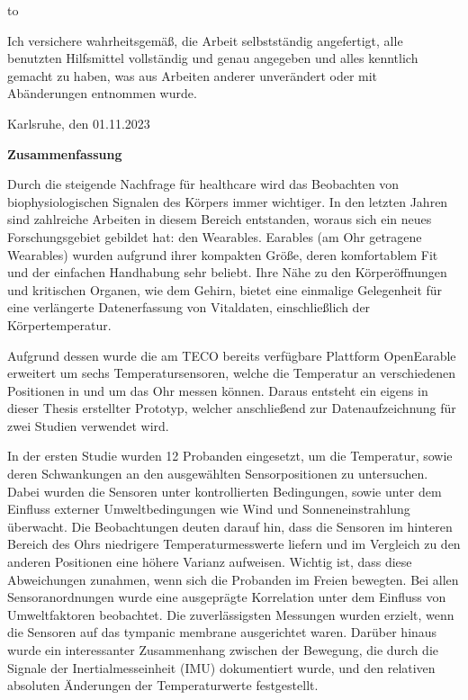 \thispagestyle{empty}
\vspace*{42\baselineskip}
\hbox to \textwidth{\hrulefill}
\par
Ich versichere wahrheitsgemäß, die Arbeit selbstständig angefertigt, alle benutzten Hilfsmittel vollständig und genau angegeben und alles kenntlich gemacht zu haben, was aus Arbeiten anderer unverändert oder mit Abänderungen entnommen wurde.

Karlsruhe, den 01.11.2023

\cleardoublepage

\vspace*{1em}
\begin{center}
	\textbf{Zusammenfassung}
\end{center}
\par

Durch die steigende Nachfrage für healthcare wird das Beobachten von biophysiologischen Signalen des Körpers immer wichtiger.
In den letzten Jahren sind zahlreiche Arbeiten in diesem Bereich entstanden, woraus sich ein neues Forschungsgebiet gebildet hat: den Wearables.
Earables (am Ohr getragene Wearables) wurden aufgrund ihrer kompakten Größe, deren komfortablem Fit und der einfachen Handhabung sehr beliebt. Ihre Nähe zu den Körperöffnungen und kritischen Organen, wie dem Gehirn, bietet eine einmalige Gelegenheit für eine verlängerte Datenerfassung von Vitaldaten, einschließlich der Körpertemperatur.

Aufgrund dessen wurde die am TECO bereits verfügbare Plattform OpenEarable erweitert um sechs Temperatursensoren, welche die Temperatur an verschiedenen Positionen in und um das Ohr messen können. 
Daraus entsteht ein eigens in dieser Thesis erstellter Prototyp, welcher anschließend zur Datenaufzeichnung für zwei Studien verwendet wird.

In der ersten Studie wurden 12 Probanden eingesetzt, um die Temperatur, sowie deren Schwankungen an den ausgewählten Sensorpositionen zu untersuchen. 
Dabei wurden die Sensoren unter kontrollierten Bedingungen, sowie unter dem Einfluss externer Umweltbedingungen wie Wind und Sonneneinstrahlung überwacht. 
Die Beobachtungen deuten darauf hin, dass die Sensoren im hinteren Bereich des Ohrs niedrigere Temperaturmesswerte liefern und im Vergleich zu den anderen Positionen eine höhere Varianz aufweisen. 
Wichtig ist, dass diese Abweichungen zunahmen, wenn sich die Probanden im Freien bewegten. 
Bei allen Sensoranordnungen wurde eine ausgeprägte Korrelation unter dem Einfluss von Umweltfaktoren beobachtet. 
Die zuverlässigsten Messungen wurden erzielt, wenn die Sensoren auf das tympanic membrane ausgerichtet waren. 
Darüber hinaus wurde ein interessanter Zusammenhang zwischen der Bewegung, die durch die Signale der Inertialmesseinheit (IMU) dokumentiert wurde, und den relativen absoluten Änderungen der Temperaturwerte festgestellt.

